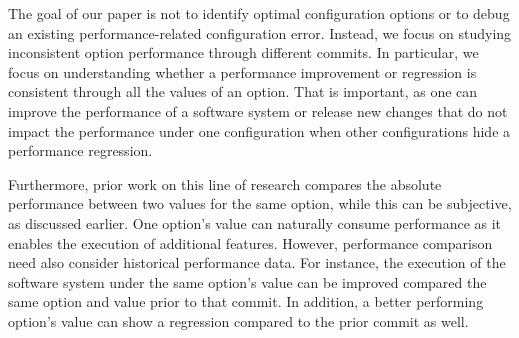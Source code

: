 The goal of our paper is not to identify optimal configuration options or to debug an existing performance-related configuration error. Instead, we focus on studying inconsistent option performance through different commits. In particular, we focus on understanding whether a performance improvement or regression is consistent through all the values of an option. That is important, as one can improve the performance of a software system or release new changes that do not impact the performance under one configuration when other configurations hide a performance regression. 

Furthermore, prior work on this line of research compares the absolute performance between two values for the same option, while this can be subjective, as discussed earlier. One option's value can naturally consume performance as it enables the execution of additional features. However, performance comparison need also consider historical performance data. For instance, the execution of the software system under the same option's value can be improved %
compared the same option and value prior to that commit. In addition, a better performing option's value can show a regression compared to the prior commit as well. %



